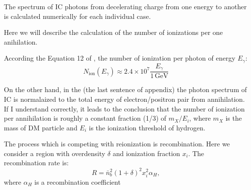 The spectrum of IC photons from decelerating charge from one energy to another is calculated numerically for each individual case.

Here we will describe the calculation of the number of ionizations per one anihilation.

According the Equation 12 of \cite{Belikov_2009}, the number of ionization per photon of energy $E_\gamma$:
\begin{equation}
N_\mathrm{ion}(E_\gamma) \approx 2.4\times10^7\dfrac{E_\gamma}{1\,\mathrm{GeV}}
\end{equation}

On the other hand, in the \cite{Belikov_2010} (the last sentence of appendix) the photon spectrum of IC is normalaized to the total energy of electron/positron pair from annihilation. If I understand correctly, it leads to the conclusion that the number of ionization per annihilation is roughly a constant fraction (1/3) of $m_X/E_i$, where $m_X$ is the mass of DM particle and $E_i$ is the ionization threshold of hydrogen.


The process which is competing with reionization is recombination. Here we consider a region with overdensity $\delta$ and ionization fraction $x_i$. The recombination rate is:
\begin{equation}
R = \bar{n}_b^2 (1+\delta)^2 x_i^2 \alpha_H,
\end{equation}
where $\alpha_H$ is a recombination coefficient
  
  
